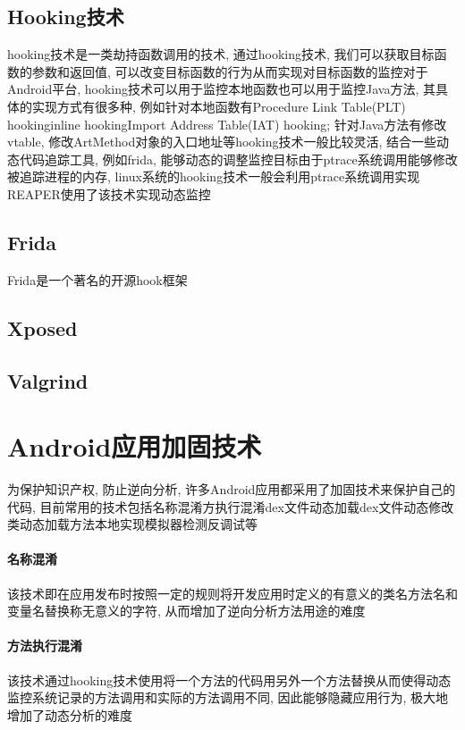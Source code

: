 \subsection{Hooking技术}
hooking技术是一类劫持函数调用的技术, 通过hooking技术, 我们可以获取目标函数的参数和返回值, 可以改变目标函数的行为从而实现对目标函数的监控\juhao 对于Android平台, hooking技术可以用于监控本地函数也可以用于监控Java方法, 其具体的实现方式有很多种, 例如针对本地函数有Procedure Link Table(PLT) hooking\dunhao inline hooking\dunhao Import Address Table(IAT) hooking; 针对Java方法有修改vtable, 修改ArtMethod对象的入口地址等\juhao hooking技术一般比较灵活, 结合一些动态代码追踪工具, 例如frida, 能够动态的调整监控目标\juhao 由于ptrace系统调用能够修改被追踪进程的内存, linux系统的hooking技术一般会利用ptrace系统调用实现\juhao REAPER使用了该技术实现动态监控\juhao

\subsection{Frida}
Frida是一个著名的开源hook框架\juhao

\subsection{Xposed}

\subsection{Valgrind}

\section{Android应用加固技术}
为保护知识产权, 防止逆向分析, 许多Android应用都采用了加固技术来保护自己的代码, 目前常用的技术包括名称混淆\dunhao 方执行混淆\dunhao dex文件动态加载\dunhao dex文件动态修改\dunhao 类动态加载\dunhao 方法本地实现\dunhao 模拟器检测\dunhao 反调试等\juhao

\paragraph*{名称混淆}
该技术即在应用发布时按照一定的规则将开发应用时定义的有意义的类名\dunhao 方法名\dunhao 和变量名替换称无意义的字符, 从而增加了逆向分析方法用途的难度\juhao

\paragraph*{方法执行混淆}
该技术通过hooking技术使用将一个方法的代码用另外一个方法替换从而使得动态监控系统记录的方法调用和实际的方法调用不同, 因此能够隐藏应用行为, 极大地增加了动态分析的难度\juhao

